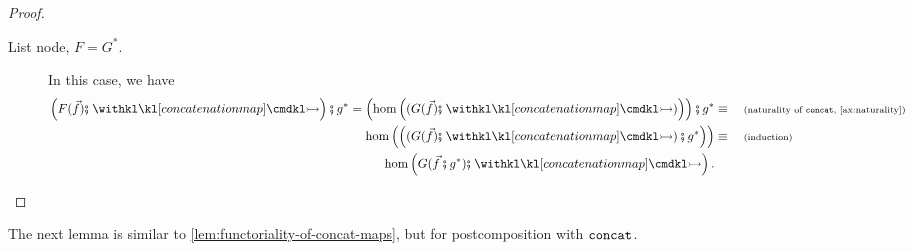 \begin{proof}
\begin{description}
        \item[List node, $F = G^*$.] In this case, we have 
        \begin{align*}
            \left( F(\vec f) \comp \concmap \right) \comp g^* = \left( \hom \left( (G(\vec f) \comp \concmap) \right) \right) \comp g^* \equalbecause{naturality of $\concatterm$, \cref{ax:naturality}} \\
            \hom \left( \left( (G(\vec f) \comp \concmap) \comp g^* \right) \right) \equalbecause{induction} \\
            \hom \left( G(\vec f \comp g^*) \comp \concmap \right).
        \end{align*}
    \end{description}
\end{proof}

The next lemma is similar to \cref{lem:functoriality-of-concat-maps}, but for postcomposition with $\mathtt{concat}$.

